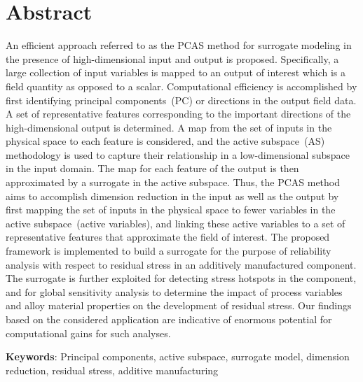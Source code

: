 \section*{Abstract}

An efficient approach referred to as the PCAS method for surrogate modeling in the presence of
high-dimensional input and output is proposed. Specifically, a large
collection of input variables is mapped to an output of interest which is a field quantity as opposed
to a scalar.
Computational efficiency is accomplished by first identifying principal components~(PC)
or directions in  the output field data. A set of representative features corresponding to the important directions
of the high-dimensional output is 
determined. A map from the set of inputs in the physical space to each feature is considered,
and the active subspace~(AS) methodology is used to capture their relationship in a low-dimensional subspace in the input 
domain. The map for each feature of the output is then approximated by a surrogate in the active subspace. Thus, the PCAS
method aims to accomplish dimension reduction in the input as well as the output by first mapping the set of inputs
in the physical space to fewer variables in the active subspace~(active variables), and linking these active variables
to a set of representative features
that approximate the field of interest. 
The proposed framework is implemented to build a surrogate for the purpose of reliability analysis
with respect to residual stress in an additively
manufactured component. The surrogate is further exploited for detecting 
stress hotspots in the component, and for global sensitivity analysis to determine the impact of process variables and
alloy material properties on the development of residual stress. Our findings based on the considered application
are indicative of enormous potential for computational gains for such analyses. 

\bigskip

\noindent \textbf{Keywords}: Principal components, active subspace, surrogate model, dimension reduction,
residual stress, additive manufacturing
